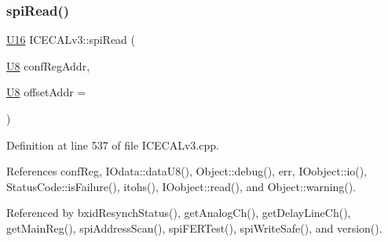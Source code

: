 \subsubsection{\texorpdfstring{spi\+Read()}{spiRead()}}
{\footnotesize\ttfamily \hyperlink{ICECALv3_8h_adf928e51a60dba0df29d615401cc55a8}{U16} I\+C\+E\+C\+A\+Lv3\+::spi\+Read (\begin{DoxyParamCaption}\item[{\hyperlink{ICECALv3_8h_a3cb25ca6f51f003950f9625ff05536fc}{U8}}]{conf\+Reg\+Addr,  }\item[{\hyperlink{ICECALv3_8h_a3cb25ca6f51f003950f9625ff05536fc}{U8}}]{offset\+Addr = {} }\end{DoxyParamCaption})\hspace{0.3cm}{\ttfamily [private]}}



Definition at line 537 of file I\+C\+E\+C\+A\+Lv3.\+cpp.



References conf\+Reg, I\+Odata\+::data\+U8(), Object\+::debug(), err, I\+Oobject\+::io(), Status\+Code\+::is\+Failure(), itohs(), I\+Oobject\+::read(), and Object\+::warning().



Referenced by bxid\+Resynch\+Status(), get\+Analog\+Ch(), get\+Delay\+Line\+Ch(), get\+Main\+Reg(), spi\+Address\+Scan(), spi\+F\+E\+R\+Test(), spi\+Write\+Safe(), and version().


